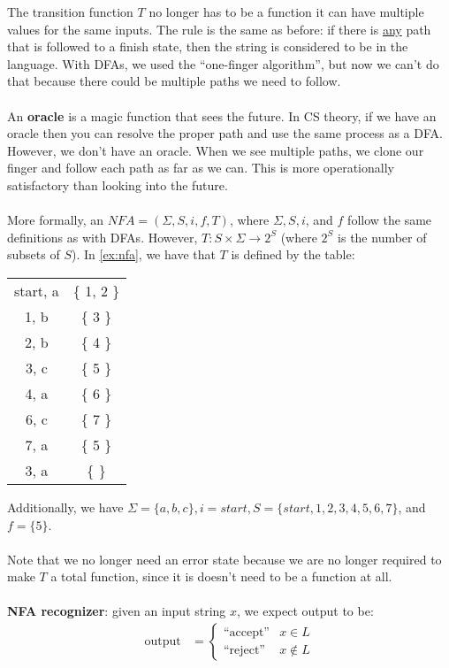 \documentclass[]{article}
\theoremstyle{definition}
\begin{document}
			The transition function $T$ no longer has to be a function \textendash{} it can have multiple values for the same inputs.
			The rule is the same as before: if there is \underline{any} path that is followed to a finish state, then the string is considered to be in the language. With DFAs, we used the ``one-finger algorithm'', but now we can't do that because there could be multiple paths we need to follow.
			\\ \\
			An \textbf{oracle} is a magic function that sees the future. In CS theory, if we have an oracle then you can resolve the proper path and use the same process as a DFA. However, we don't have an oracle. When we see multiple paths, we clone our finger and follow each path as far as we can. This is more operationally satisfactory than looking into the future.
			\\ \\
			More formally, an $NFA = (\Sigma, S, i, f, T)$, where $\Sigma, S, i$, and $f$ follow the same definitions as with DFAs. However, $T: S \times \Sigma \to 2^S$ (where $2^S$ is the number of subsets of $S$). In \ref{ex:nfa}, we have that $T$ is defined by the table:
			\begin{center}
				\begin{tabular}{|c|c|}
					\hline
					start, a & \{ 1, 2 \} \\
					1, b & \{ 3 \} \\
					2, b & \{ 4 \} \\
					3, c & \{ 5 \} \\
					4, a & \{ 6 \} \\
					6, c & \{ 7 \} \\
					7, a & \{ 5 \} \\
					3, a & \{  \} \\ \hline
				\end{tabular}
			\end{center}
			Additionally, we have $\Sigma = \{a, b, c\}, i = start, S = \{start, 1, 2, 3, 4, 5, 6, 7\}$, and $f = \{ 5 \}$.
			\\ \\
			Note that we no longer need an error state because we are no longer required to make $T$ a total function, since it is doesn't need to be a function at all. 
			\\ \\	
			\textbf{NFA recognizer}: given an input string $x$, we expect output to be:
			\begin{align*}
				\text{output} &= \begin{cases}
					\text{``accept''} & x \in L \\
					\text{``reject''} & x \not \in L
				\end{cases}
			\end{align*}
\end{document}
